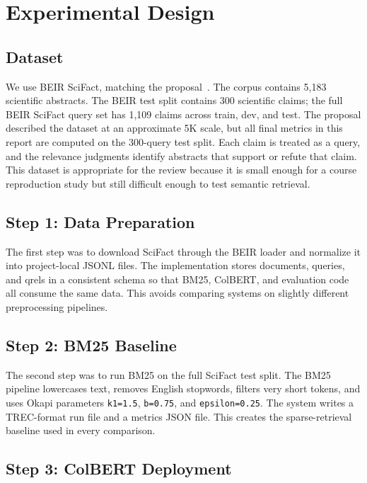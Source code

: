 \documentclass[sigconf,nonacm]{acmart}
\begin{document}
\section{Experimental Design}

\subsection{Dataset}

We use BEIR SciFact, matching the
proposal~\cite{wadden2020scifact,thakur2021beir}. The corpus contains 5,183
scientific abstracts. The BEIR test split contains 300 scientific claims; the
full BEIR SciFact query set has 1,109 claims across train, dev, and test. The
proposal described the dataset at an approximate 5K scale, but all final metrics
in this report are computed on the 300-query test split. Each claim is treated
as a query, and the relevance judgments identify abstracts that support or
refute that claim. This dataset is appropriate for the review because it is
small enough for a course reproduction study but still difficult enough to test
semantic retrieval.

\subsection{Step 1: Data Preparation}

The first step was to download SciFact through the BEIR loader and normalize it
into project-local JSONL files. The implementation stores documents, queries,
and qrels in a consistent schema so that BM25, ColBERT, and evaluation code all
consume the same data. This avoids comparing systems on slightly different
preprocessing pipelines.

\subsection{Step 2: BM25 Baseline}

The second step was to run BM25 on the full SciFact test split. The BM25
pipeline lowercases text, removes English stopwords, filters very short tokens,
and uses Okapi parameters \texttt{k1=1.5}, \texttt{b=0.75}, and
\texttt{epsilon=0.25}. The system writes a TREC-format run file and a metrics
JSON file. This creates the sparse-retrieval baseline used in every comparison.

\subsection{Step 3: ColBERT Deployment}
\end{document}
